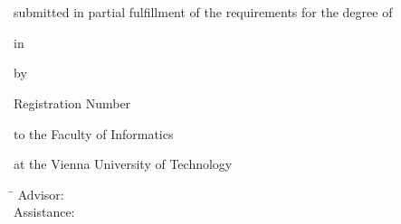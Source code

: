 \begin{center}
{\ \vspace{3.4cm}}

\begin{minipage}[t][2.8cm][s]{\textwidth}%
\centering
\thesistitlefontHUGE\sffamily\bfseries\tuinfthesistitleen\\
\bigskip
{\thesistitlefonthuge\sffamily\bfseries\tuinfthesissubtitle}
\end{minipage}

\vspace{1.3cm}

{\thesistitlefontLARGE\sffamily \tuinfthesistypeen}

\vspace{6mm}

{\thesistitlefontlarge\sffamily submitted in partial fulfillment of the requirements for the degree of}

\vspace{6mm}

{\thesistitlefontLARGE\sffamily\bfseries \tuinfthesisdegreeen}

\vspace{6mm}

{\thesistitlefontlarge\sffamily in}

\vspace{6mm}

{\thesistitlefontLarge\sffamily\bfseries \tuinfthesiscurriculumen}

\vspace{6.5mm}

{\thesistitlefontlarge\sffamily by}

\vspace{6mm}

{\thesistitlefontLarge\sffamily\bfseries \tuinfthesisauthor}

\vspace{1.5mm}

{\thesistitlefontlarge\sffamily Registration Number \tuinfthesismatrikelno} 

\vspace{1.4cm}

\begin{minipage}[t][1.6cm][t]{\textwidth}%
  \vspace{0pt}\raggedright\thesistitlefontnormalsize\sffamily
  to the Faculty of Informatics 

  at the Vienna University of Technology
\end{minipage}

\vspace{0pt}\raggedright\thesistitlefontnormalsize\sffamily
\begin{minipage}[t][4cm][t]{\textwidth}%
  \begin{tabbing}%
	    \hspace{19mm} \= \hspace{66mm} \kill
	    Advisor: \> \tuinfthesisbetreins\\
	    Assistance: \> \tuinfthesisbetrzwei\\
	                \> \tuinfthesisbetrdrei
     \end{tabbing}
\end{minipage}


\end{center}
